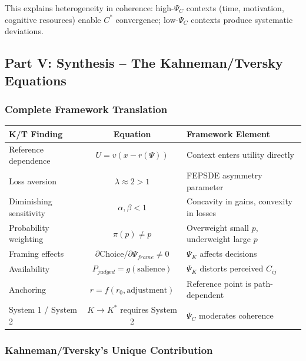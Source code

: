This explains heterogeneity in coherence: high-$\Psi_C$ contexts (time, motivation, 
cognitive resources) enable $C^*$ convergence; low-$\Psi_C$ contexts produce 
systematic deviations.

\subsection{Part V: Synthesis – The Kahneman/Tversky Equations}

\subsubsection{Complete Framework Translation}

\begin{center}
\renewcommand{\arraystretch}{1.5}
\begin{tabular}{|l|c|l|}
\hline
\textbf{K/T Finding} & \textbf{Equation} & \textbf{Framework Element} \\
\hline
Reference dependence & $U = v(x - r(\Psi))$ & Context enters utility directly \\
\hline
Loss aversion & $\lambda \approx 2 > 1$ & FEPSDE asymmetry parameter \\
\hline
Diminishing sensitivity & $\alpha, \beta < 1$ & Concavity in gains, convexity in losses \\
\hline
Probability weighting & $\pi(p) \neq p$ & Overweight small $p$, underweight large $p$ \\
\hline
Framing effects & $\partial \text{Choice}/\partial \Psi_{frame} \neq 0$ & $\Psi_K$ affects decisions \\
\hline
Availability & $P_{judged} = g(\text{salience})$ & $\Psi_K$ distorts perceived $C_{ij}$ \\
\hline
Anchoring & $r = f(r_0, \text{adjustment})$ & Reference point is path-dependent \\
\hline
System 1 / System 2 & $K \to K^*$ requires System 2 & $\Psi_C$ moderates coherence \\
\hline
\end{tabular}
\end{center}

\subsubsection{Kahneman/Tversky's Unique Contribution}

